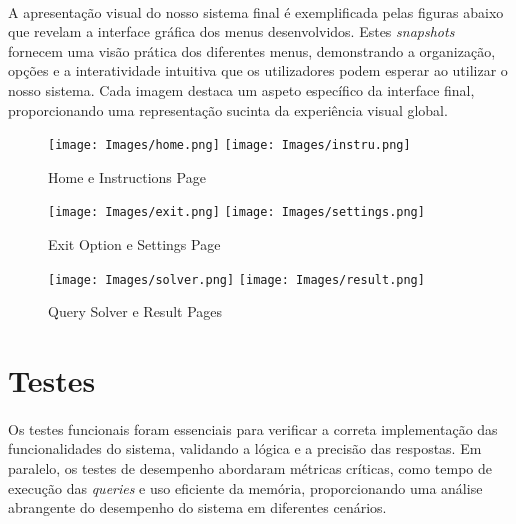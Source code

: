 \documentclass{article}
\begin{document}
\paragraph{}A apresentação visual do nosso sistema final é exemplificada pelas figuras abaixo que revelam a interface gráfica dos menus desenvolvidos. Estes \textit{snapshots} fornecem uma visão prática dos diferentes menus, demonstrando a organização, opções e a interatividade intuitiva que os utilizadores podem esperar ao utilizar o nosso sistema. Cada imagem destaca um aspeto específico da interface final, proporcionando uma representação sucinta da experiência visual global.
\begin{figure}[H]
\begin{center}
	\texttt{[image: Images/home.png]}
        \quad\quad\quad\quad\quad\texttt{[image: Images/instru.png]} 
        \caption{Home e Instructions Page}
\end{center}
\end{figure}
\begin{figure}[H]
\begin{center}
        \texttt{[image: Images/exit.png]} 
        \quad\quad\quad\quad\quad\texttt{[image: Images/settings.png]} 
        \caption{Exit Option e Settings Page} 
\end{center}
\end{figure}
\begin{figure}[H]
\begin{center}
        \texttt{[image: Images/solver.png]} 
        \quad\quad\quad\quad\quad\texttt{[image: Images/result.png]}
        \caption{Query Solver e Result Pages}
\end{center}
\end{figure}
\section{Testes} 
\paragraph{}Os testes funcionais foram essenciais para verificar a correta implementação das funcionalidades do sistema, validando a lógica e a precisão das respostas. Em paralelo, os testes de desempenho abordaram métricas críticas, como tempo de execução das \textit{queries} e uso eficiente da memória, proporcionando uma análise abrangente do desempenho do sistema em diferentes cenários.
\vspace{-0.3cm}
\end{document}
